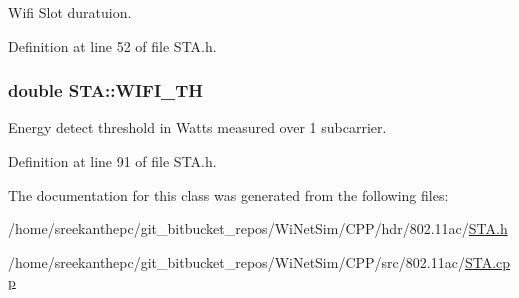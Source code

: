 Wifi Slot duratuion. 



Definition at line 52 of file S\-T\-A.\-h.

\hypertarget{classSTA_a4cf7f03951b6bf6263b55c5ff4f28f4c}{
\subsubsection[{W\-I\-F\-I\-\_\-\-T\-H}]{\setlength{\rightskip}{0pt plus 5cm}double S\-T\-A\-::\-W\-I\-F\-I\-\_\-\-T\-H\hspace{0.3cm}{\ttfamily [private]}}}\label{classSTA_a4cf7f03951b6bf6263b55c5ff4f28f4c}


Energy detect threshold in Watts measured over 1 subcarrier. 



Definition at line 91 of file S\-T\-A.\-h.



The documentation for this class was generated from the following files\-:\begin{DoxyCompactItemize}
\item 
/home/sreekanthepc/git\-\_\-bitbucket\-\_\-repos/\-Wi\-Net\-Sim/\-C\-P\-P/hdr/802.\-11ac/\hyperlink{STA_8h}{S\-T\-A.\-h}\item 
/home/sreekanthepc/git\-\_\-bitbucket\-\_\-repos/\-Wi\-Net\-Sim/\-C\-P\-P/src/802.\-11ac/\hyperlink{STA_8cpp}{S\-T\-A.\-cpp}\end{DoxyCompactItemize}
